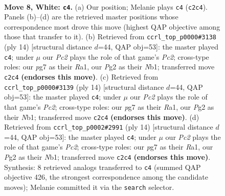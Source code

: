 \documentclass[11pt]{article}
\begin{document}
\begin{figure}[p]\centering
\begin{subfigure}{0.46\textwidth}\centering
\resizebox{\linewidth}{!}{%
\newchessgame
\chessboard[
  setfen={r1bqkb1r/ppp2pp1/2n5/3p3p/3Pn3/3B1N2/PPP2PPP/RNBQ1RK1 w kq - 0 8},
  showmover=false,
  pgfstyle=straightmove, color=movearrow, markmove={c2-c4}
]}
\caption{}
\end{subfigure}\hfill
\begin{subfigure}{0.46\textwidth}\centering
\resizebox{\linewidth}{!}{%
\newchessgame
\chessboard[
  setfen={rnbq1rk1/ppp2ppp/3b4/3p4/3Pn3/3B1N2/PPP2PPP/RNBQ1RK1 w - - 4 8},
  showmover=false,
  pgfstyle=straightmove, color=movearrow, markmove={c2-c4}
]}
\caption{}
\end{subfigure}
\\[4pt]
\begin{subfigure}{0.46\textwidth}\centering
\resizebox{\linewidth}{!}{%
\newchessgame
\chessboard[
  setfen={rnbq1rk1/ppp2ppp/3b4/3p4/3Pn3/3B1N2/PPP2PPP/RNBQ1RK1 w - - 4 8},
  showmover=false,
  pgfstyle=straightmove, color=movearrow, markmove={c2-c4}
]}
\caption{}
\end{subfigure}\hfill
\begin{subfigure}{0.46\textwidth}\centering
\resizebox{\linewidth}{!}{%
\newchessgame
\chessboard[
  setfen={rnbq1rk1/ppp2ppp/3b4/3p4/3Pn3/3B1N2/PPP2PPP/RNBQ1RK1 w - - 4 8},
  showmover=false,
  pgfstyle=straightmove, color=movearrow, markmove={c2-c4}
]}
\caption{}
\end{subfigure}
\caption{\textbf{Move 8, White: \texttt{c4}.} (a) Our position; Melanie plays \texttt{c4} (\texttt{c2c4}). Panels (b)--(d) are the retrieved master positions whose correspondence most drove this move (highest QAP objective among those that transfer to it). (b) Retrieved from \texttt{ccrl\_top\_p0000\#3138} (ply 14) [structural distance $d$=44, QAP obj=53]: the master played \texttt{c4}; under $\mu$ our \emph{Pc2} plays the role of that game's \emph{Pc2}; cross-type roles: our \emph{p}g7 as their \emph{R}a1, our \emph{P}g2 as their \emph{N}b1; transferred move \texttt{c2c4} \textbf{(endorses this move)}. (c) Retrieved from \texttt{ccrl\_top\_p0000\#3139} (ply 14) [structural distance $d$=44, QAP obj=53]: the master played \texttt{c4}; under $\mu$ our \emph{Pc2} plays the role of that game's \emph{Pc2}; cross-type roles: our \emph{p}g7 as their \emph{R}a1, our \emph{P}g2 as their \emph{N}b1; transferred move \texttt{c2c4} \textbf{(endorses this move)}. (d) Retrieved from \texttt{ccrl\_top\_p0002\#2991} (ply 14) [structural distance $d$=44, QAP obj=53]: the master played \texttt{c4}; under $\mu$ our \emph{Pc2} plays the role of that game's \emph{Pc2}; cross-type roles: our \emph{p}g7 as their \emph{R}a1, our \emph{P}g2 as their \emph{N}b1; transferred move \texttt{c2c4} \textbf{(endorses this move)}. Synthesis: 8 retrieved analogs transferred to \texttt{c4} (summed QAP objective 426, the strongest correspondence among the candidate moves); Melanie committed it via the \texttt{search} selector.}
\label{fig:thought-m14}
\end{figure}
\end{document}
